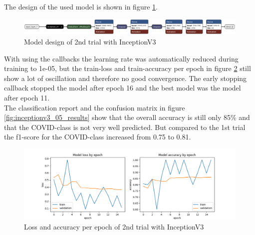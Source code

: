 \documentclass{article}
\begin{document}
The design of the used model is shown in figure \ref{fig:inceptionv3_05.keras_model_design}.
\begin{figure}[htb] %
    \centering
    \includegraphics[width=1.0\linewidth]{inceptionv3_05.keras_model_design_nice.png}
    \caption{Model design of 2nd trial with InceptionV3}
    \label{fig:inceptionv3_05.keras_model_design}
\end{figure}

With using the callbacks the learning rate was automatically reduced during training to 1e-05, but the train-loss and train-accuracy per epoch in figure \ref{fig:inceptionv3_05_loss_accuracy} still show a lot of oscillation and therefore no good convergence. The early stopping callback stopped the model after epoch 16 and the best model was the model after epoch 11.\\
The classification report and the confusion matrix in figure \ref{fig:inceptionv3_05_results} show that the overall accuracy is still only 85\% and that the COVID-class is not very well predicted. But compared to the 1st trial the f1-score for the COVID-class increased from 0.75 to 0.81.

\begin{figure}[htb] %
    \centering
    \includegraphics[width=1.0\linewidth]{inceptionv3_05_loss_accuracy.png}
    \caption{Loss and accuracy per epoch of 2nd trial with InceptionV3}
    \label{fig:inceptionv3_05_loss_accuracy}
\end{figure}
\end{document}
